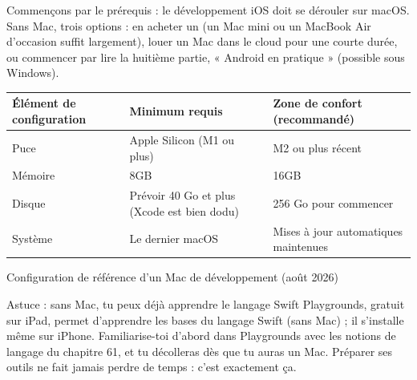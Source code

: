 


Commençons par le prérequis : le développement iOS doit se dérouler sur macOS. Sans Mac, trois options : en acheter un (un Mac mini ou un MacBook Air d’occasion suffit largement), louer un Mac dans le cloud pour une courte durée, ou commencer par lire la huitième partie, « Android en pratique » (possible sous Windows).

\begin{center}
\begin{tabularx}{\linewidth}{|X|X|X|}
\hline
\textbf{Élément de configuration} & \textbf{Minimum requis} & \textbf{Zone de confort (recommandé)} \tabularnewline
\hline
Puce & Apple Silicon (M1 ou plus) & M2 ou plus récent \tabularnewline
Mémoire & 8GB & 16GB \tabularnewline
Disque & Prévoir 40 Go et plus (Xcode est bien dodu) & 256 Go pour commencer \tabularnewline
Système & Le dernier macOS & Mises à jour automatiques maintenues \tabularnewline
\hline
\end{tabularx}
\end{center}

\begin{center}\small\color{gray}Configuration de référence d’un Mac de développement (août 2026)\end{center}

\begin{tcbinfo}{Astuce : sans Mac, tu peux déjà apprendre le langage}
Swift Playgrounds, gratuit sur iPad, permet d’apprendre les bases du langage Swift (sans Mac) ; il s’installe même sur iPhone. Familiarise-toi d’abord dans Playgrounds avec les notions de langage du chapitre 61, et tu décolleras dès que tu auras un Mac. Préparer ses outils ne fait jamais perdre de temps : c’est exactement ça.

\end{tcbinfo}


